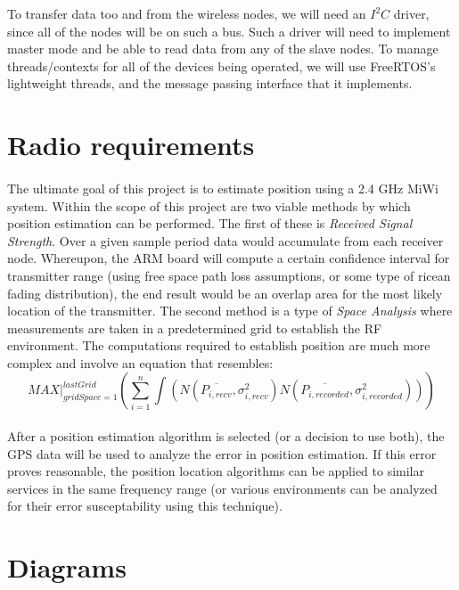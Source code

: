 \documentclass{article}
\begin{document}
To transfer data too and from the wireless nodes, we will need an $I^2C$ driver,
since all of the nodes will be on such a bus.  Such a driver will need to
implement master mode and be able to read data from any of the slave nodes.  To
manage threads/contexts for all of the devices being operated, we will use
FreeRTOS's lightweight threads, and the message passing interface that it
implements.

\section*{Radio requirements}
\paragraph*{}
The ultimate goal of this project is to estimate position using a 2.4 GHz MiWi system.  Within the scope of this project are two viable methods by which position estimation can be performed.  The first of these is \textit{Received Signal Strength}.  Over a given sample period data would accumulate from each receiver node.  Whereupon, the ARM board will compute a certain confidence interval for transmitter range (using free space path loss assumptions, or some type of ricean fading distribution), the end result would be an overlap area for the most likely location of the transmitter.  The second method is a type of \textit{Space Analysis} where measurements are taken in a predetermined grid to establish the RF environment.  The computations required to establish position are much more complex and involve an equation that resembles:
\begin{equation}
 MAX\vert_{gridSpace = 
1}^{lastGrid}\left(\sum_{i=1}^{n}\int\left(N(\overline{P_{i,recv}},\sigma_{i,recv}^{2})N(\overline{P_{i,recorded}},\sigma_{i,recorded}^{2})\right)\right)
\end{equation}
\paragraph*{}
After a position estimation algorithm is selected (or a decision to use both), the GPS data will be used to analyze the error in position estimation.  If this error proves reasonable, the position location algorithms can be applied to similar services in the same frequency range (or various environments can be analyzed for their error susceptability using this technique).

\section*{Diagrams}
\end{document}
